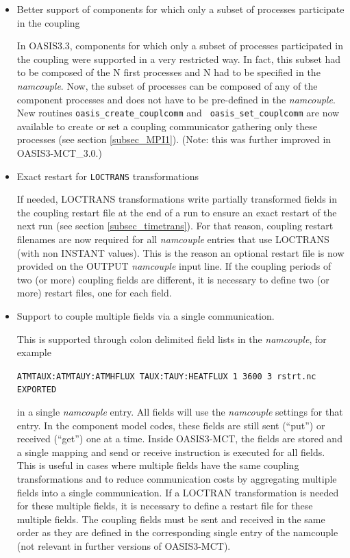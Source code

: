 \begin{itemize}

\item Better support of components for which only a subset of processes
  participate in the coupling

In OASIS3.3, components for which only a subset of processes
  participated in the coupling were supported in a very restricted
  way. In fact, this subset had to be composed of the N first
  processes and N had to be specified in the {\it namcouple}. Now, the
  subset of processes can be composed of any of the component
  processes and does not have to be pre-defined in the {\it
    namcouple}. New routines {\tt oasis\_create\_couplcomm} and {\tt
  oasis\_set\_couplcomm} are now available to create or set a coupling
  communicator gathering only these processes (see section \ref{subsec_MPI1}). (Note: this was further improved in OASIS3-MCT\_3.0.)

\item Exact restart for {\tt LOCTRANS} transformations

If needed, LOCTRANS transformations write partially
  transformed fields  in the coupling restart file at the end of a run
  to ensure an exact restart of the next run (see section
  \ref{subsec_timetrans}). For that
  reason, coupling restart filenames are now required for all {\it
    namcouple} entries that use LOCTRANS (with non INSTANT
  values). This is the reason an optional restart file is now provided
  on the OUTPUT {\it namcouple} input line. If the coupling periods of
  two (or more) coupling fields are different, it is necessary to define
  two (or more) restart files, one for each field.

\item Support to couple multiple fields via a single communication.

 This is supported through colon
delimited field lists in the {\it namcouple}, for example

{\tt ATMTAUX:ATMTAUY:ATMHFLUX  TAUX:TAUY:HEATFLUX 1 3600 3 rstrt.nc EXPORTED}

 in a single {\it namcouple} entry. All fields will use the
{\it namcouple} settings for that entry. In the component model codes,
these fields are still sent (``put'') or received (``get'') one at a
time. Inside OASIS3-MCT, the fields are stored and a single mapping
and send or receive instruction is executed for all fields. This is
useful in cases where multiple fields have the same coupling
transformations and to reduce communication costs by aggregating multiple
fields into a single communication. If a LOCTRAN transformation is needed
for these multiple fields, it is necessary to define a restart file for
these multiple fields. The coupling fields must be sent and received in the same order
as they are defined in the corresponding single entry of the namcouple
(not relevant in further versions of OASIS3-MCT).


\end{itemize}
